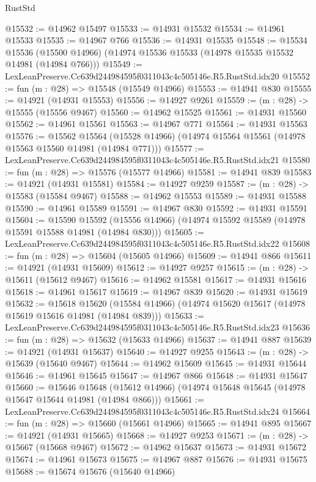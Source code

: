\begin{lexlean}{RustStd}
\begin{coremodule}
@15532 := @14962 @15497
@15533 := @14931 @15532
@15534 := @14961 @15533
@15535 := @14967 @766
@15536 := @14931 @15535
@15548 := @15534
    @15536
    (@15500 @14966)
    (@14974 @15536 @15533 (@14978 @15535 @15532 @14981 (@14984 @766)))
@15549 := LexLeanPreserve.Cc639d244984595f0311043c4c505146e.R5.RustStd.idx20
@15552 := fun (m : @28) => @15548 (@15549 @14966)
@15553 := @14941 @830
@15555 := @14921 (@14931 @15553)
@15556 := @14927 @9261
@15559 := (m : @28) -> @15555 (@15556 @9467)
@15560 := @14962 @15525
@15561 := @14931 @15560
@15562 := @14961 @15561
@15563 := @14967 @771
@15564 := @14931 @15563
@15576 := @15562
    @15564
    (@15528 @14966)
    (@14974 @15564 @15561 (@14978 @15563 @15560 @14981 (@14984 @771)))
@15577 := LexLeanPreserve.Cc639d244984595f0311043c4c505146e.R5.RustStd.idx21
@15580 := fun (m : @28) => @15576 (@15577 @14966)
@15581 := @14941 @839
@15583 := @14921 (@14931 @15581)
@15584 := @14927 @9259
@15587 := (m : @28) -> @15583 (@15584 @9467)
@15588 := @14962 @15553
@15589 := @14931 @15588
@15590 := @14961 @15589
@15591 := @14967 @830
@15592 := @14931 @15591
@15604 := @15590
    @15592
    (@15556 @14966)
    (@14974 @15592 @15589 (@14978 @15591 @15588 @14981 (@14984 @830)))
@15605 := LexLeanPreserve.Cc639d244984595f0311043c4c505146e.R5.RustStd.idx22
@15608 := fun (m : @28) => @15604 (@15605 @14966)
@15609 := @14941 @866
@15611 := @14921 (@14931 @15609)
@15612 := @14927 @9257
@15615 := (m : @28) -> @15611 (@15612 @9467)
@15616 := @14962 @15581
@15617 := @14931 @15616
@15618 := @14961 @15617
@15619 := @14967 @839
@15620 := @14931 @15619
@15632 := @15618
    @15620
    (@15584 @14966)
    (@14974 @15620 @15617 (@14978 @15619 @15616 @14981 (@14984 @839)))
@15633 := LexLeanPreserve.Cc639d244984595f0311043c4c505146e.R5.RustStd.idx23
@15636 := fun (m : @28) => @15632 (@15633 @14966)
@15637 := @14941 @887
@15639 := @14921 (@14931 @15637)
@15640 := @14927 @9255
@15643 := (m : @28) -> @15639 (@15640 @9467)
@15644 := @14962 @15609
@15645 := @14931 @15644
@15646 := @14961 @15645
@15647 := @14967 @866
@15648 := @14931 @15647
@15660 := @15646
    @15648
    (@15612 @14966)
    (@14974 @15648 @15645 (@14978 @15647 @15644 @14981 (@14984 @866)))
@15661 := LexLeanPreserve.Cc639d244984595f0311043c4c505146e.R5.RustStd.idx24
@15664 := fun (m : @28) => @15660 (@15661 @14966)
@15665 := @14941 @895
@15667 := @14921 (@14931 @15665)
@15668 := @14927 @9253
@15671 := (m : @28) -> @15667 (@15668 @9467)
@15672 := @14962 @15637
@15673 := @14931 @15672
@15674 := @14961 @15673
@15675 := @14967 @887
@15676 := @14931 @15675
@15688 := @15674
    @15676
    (@15640 @14966)

\end{coremodule}
\end{lexlean}
